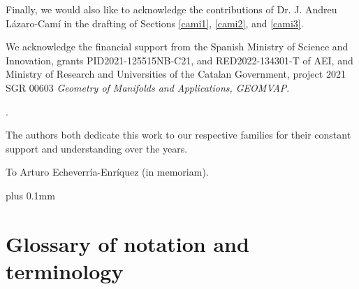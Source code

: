 \documentclass[12pt]{report}
\begin{document}
Finally, we would also like to acknowledge the contributions of Dr. J. Andreu L\'azaro-Cam\'i in the drafting of Sections \ref{cami1}, \ref{cami2}, and \ref{cami3}.

We acknowledge the financial support from the 
Spanish Ministry of Science and Innovation, grants  PID2021-125515NB-C21, and RED2022-134301-T of AEI, 
and Ministry of Research and Universities of
the Catalan Government, project 2021 SGR 00603 \textsl{Geometry of Manifolds and Applications, GEOMVAP}.




\newpage
.

\vspace{7cm}

\noindent The authors both dedicate this work to our respective families for their constant support and understanding over the years.

\vspace{0,5cm}

\noindent  To Arturo Echeverr\'ia-Enr\'iquez (in memoriam).

{\setcounter{tocdepth}{2}
\def\baselinestretch{1}
\small
\def\addvspace#1{\vskip 1pt}
\parskip 0pt plus 0.1mm
\tableofcontents
}




\chapter*{Glossary of notation and terminology}
\end{document}
